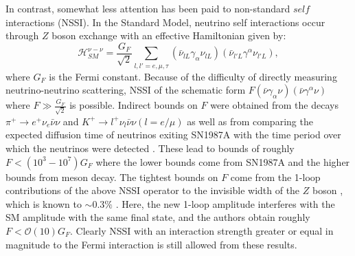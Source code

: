 \documentclass[a4paper,12pt]{article}
\begin{document}
In contrast, somewhat less attention has been paid to non-standard $\textit{self}$ interactions (NSSI). In the Standard Model, neutrino self interactions occur through $Z$ boson exchange with an effective Hamiltonian given by:
\begin{equation} \label{eq:2}
\mathcal{H}_{SM}^{\nu-\nu} = \frac{G_{F}}{\sqrt{2}}\sum_{l,l' = e,\mu,\tau} (\bar{\nu}_{lL}\gamma_{\alpha}\nu_{lL})(\bar{\nu}_{l'L}\gamma^{\alpha}\nu_{l'L}),
\end{equation}
where $G_{F}$ is the Fermi constant. Because of the difficulty of directly measuring neutrino-neutrino scattering, NSSI of the schematic form $F(\bar{\nu}\gamma_{\alpha}\nu)(\bar{\nu}\gamma^{\alpha}\nu)$ where $F \gg \frac{G_{F}}{\sqrt{2}}$ is possible. Indirect bounds on $F$ were obtained from the decays $\pi^{+}\rightarrow e^{+}\nu_{e}\bar{\nu}\nu$ and $K^{+}\rightarrow l^{+}\nu_{l}\bar{\nu}\nu(l = e/\mu)$ \cite{Manohar:1987ec,Bilenky:1980ym} as well as from comparing the expected diffusion time of neutrinos exiting SN1987A with the time period over which the neutrinos were detected \cite{BialynickaBirula:1964zz}. These lead to bounds of roughly $F< (10^{3}-10^{7}) G_{F}$ where the lower bounds come from SN1987A and the higher bounds from meson decay. The tightest bounds on $F$ come from the 1-loop contributions of the above NSSI operator to the invisible width of the $Z$ boson \cite{Bilenky:1994ma}, which is known to $\sim 0.3\%$ \cite{Tanabashi:2018oca}. Here, the new 1-loop amplitude interferes with the SM amplitude with the same final state, and the authors obtain roughly $F<\mathcal{O}(10)G_{F}$. Clearly NSSI with an interaction strength greater or equal in magnitude to the Fermi interaction is still allowed from these results.
\vskip 0.15in
\end{document}

